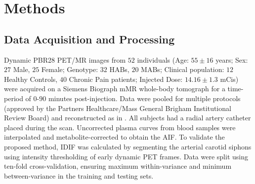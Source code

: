 
\section{Methods} \label{sec:methods} 
\vspace{-0.15cm}
    \subsection{Data Acquisition and Processing}\label{sec:dataproc}
        Dynamic \gls{PBR28} \gls{PET}/\gls{MR} images from $52$ individuals (Age: $55 \pm 16$ years; Sex: $27$ Male, $25$ Female; Genotype: $32$ \glspl{HAB}, $20$ \glspl{MAB}; Clinical population: $12$ Healthy Controls, $40$ Chronic Pain patients; Injected Dose: $14.16 \pm 1.3$ \glspl{mCi}) were acquired on a Siemens Biograph mMR whole-body tomograph for a time-period of $0$-$90$ minutes post-injection. Data were pooled for multiple protocols (approved by the Partners Healthcare/Mass General Brigham Institutional Review Board) and reconstructed as in \cite{Brusaferri2022ThePandemic}. All subjects had a radial artery catheter placed during the scan. Uncorrected plasma curves from blood samples were interpolated and metabolite-corrected to obtain the \gls{AIF}.     To validate the proposed method, \gls{IDIF} was calculated by segmenting the arterial carotid siphons using intensity thresholding of early dynamic \gls{PET} frames. Data were split using ten-fold cross-validation, ensuring maximum within-variance and minimum between-variance in the training and testing sets.
        

